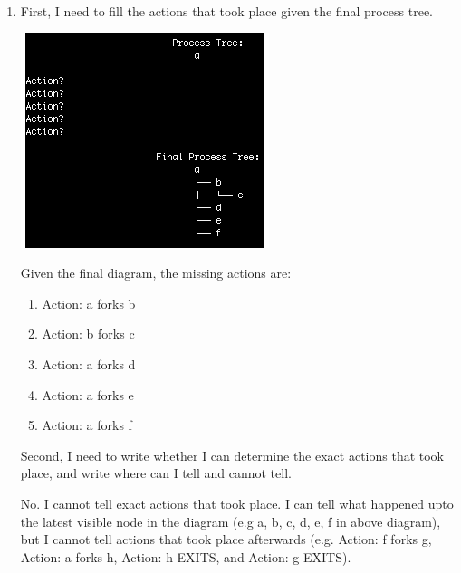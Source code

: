 \documentclass[12pt]{article}
\begin{document}
\begin{enumerate}[1.]
    \item

    First, I need to fill the actions that took place given the final process tree.

    \bigskip

    \begin{center}
    \includegraphics[width=0.7\linewidth]{images/worksheet_2_solution_13.png}
    \end{center}

    Given the final diagram, the missing actions are:

    \begin{enumerate}[1.]
        \item Action: a forks b
        \item Action: b forks c
        \item Action: a forks d
        \item Action: a forks e
        \item Action: a forks f
    \end{enumerate}

    Second, I need to write whether I can determine the exact actions that took place,
    and write where can I tell and cannot tell.

    \bigskip

    No. I cannot tell exact actions that took place. I can tell what happened upto
    the latest visible node in the diagram (e.g a, b, c, d, e, f in above diagram), but I cannot tell
    actions that took place afterwards (e.g. Action: f forks g, Action: a forks h, Action: h EXITS, and Action: g EXITS).

\end{enumerate}

\newpage
\end{document}
